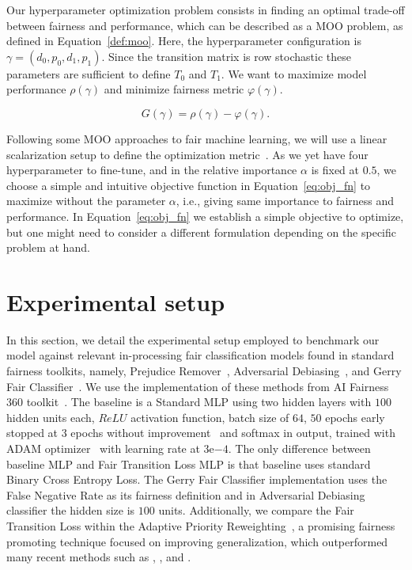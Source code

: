 Our hyperparameter optimization problem consists in finding an optimal trade-off between fairness and performance, which can be described as a MOO problem, as defined in Equation~\ref{def:moo}. Here, the hyperparameter configuration is $\gamma = (d_0, p_0, d_1, p_1)$. Since the transition matrix is row stochastic these parameters are sufficient to define $T_0$ and $T_1$. We want to maximize model performance $\rho(\gamma)$ and minimize fairness metric $\varphi(\gamma)$. 

\begin{equation} \label{eq:obj_fn}
    G(\gamma) = \rho(\gamma) - \varphi(\gamma).
\end{equation}

Following some MOO approaches to fair machine learning, we will use a linear scalarization setup to define the optimization metric~\citep{Schmucker2020,Petrovic2021}. As we yet have four hyperparameter to fine-tune, and in \cite{Cruz2021} the relative importance $\alpha$ is fixed at $0.5$, we choose a simple and intuitive objective function in Equation~\ref{eq:obj_fn} to maximize without the parameter $\alpha$, i.e., giving same importance to fairness and performance. In Equation~\ref{eq:obj_fn} we establish a simple objective to optimize, but one might need to consider a different formulation depending on the specific problem at hand.


\section{Experimental setup} \label{sec:ftl_experimental}

In this section, we detail the experimental setup employed to benchmark our model against relevant in-processing fair classification models found in standard fairness toolkits, namely, Prejudice Remover~\citep{Kamishima2012}, Adversarial Debiasing~\citep{Zhang2018}, and Gerry Fair Classifier~\citep{kearns18a}. We use the implementation of these methods from AI Fairness 360 toolkit~\citep{aif360-oct-2018}. The baseline is a Standard MLP using two hidden layers with $100$ hidden units each, $ReLU$ activation function, batch size of $64$, $50$ epochs early stopped at $3$ epochs without improvement~\citep{Li2020} and softmax in output, trained with ADAM optimizer~\citep{KingmaB14} with learning rate at $3\mathrm{e}{-4}$. The only difference between baseline MLP and Fair Transition Loss MLP is that baseline uses standard Binary Cross Entropy Loss. The Gerry Fair Classifier implementation uses the False Negative Rate as its fairness definition and in Adversarial Debiasing classifier the hidden size is $100$ units. Additionally, we compare the Fair Transition Loss within the Adaptive Priority Reweighting~\cite{HuXT23}, a promising fairness promoting technique focused on improving generalization, which outperformed many recent methods such as \cite{jiang2020identifying}, \cite{mroueh2021fair}, and \cite{roh2020fairbatch}.

